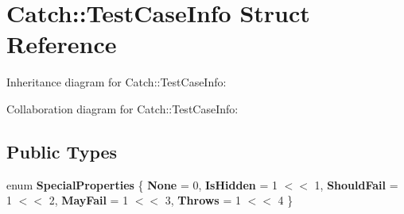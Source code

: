 \hypertarget{struct_catch_1_1_test_case_info}{}\section{Catch\+:\+:Test\+Case\+Info Struct Reference}
\label{struct_catch_1_1_test_case_info}


Inheritance diagram for Catch\+:\+:Test\+Case\+Info\+:


Collaboration diagram for Catch\+:\+:Test\+Case\+Info\+:
\subsection*{Public Types}
\begin{DoxyCompactItemize}
\item 
\mbox{\label{struct_catch_1_1_test_case_info_a39b232f74b4a7a6f2183b96759027eac}} 
enum {\bfseries Special\+Properties} \{ \newline
{\bfseries None} = 0, 
{\bfseries Is\+Hidden} = 1 $<$$<$ 1, 
{\bfseries Should\+Fail} = 1 $<$$<$ 2, 
{\bfseries May\+Fail} = 1 $<$$<$ 3, 
\newline
{\bfseries Throws} = 1 $<$$<$ 4
 \}
\end{DoxyCompactItemize}
